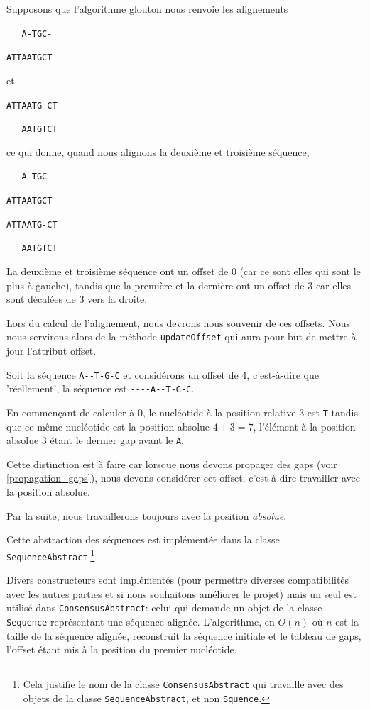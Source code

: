 \begin{exemple} [Offset]
	Supposons que l'algorithme glouton nous renvoie les alignements

	\verb|   A-TGC-|

	\verb|ATTAATGCT|

	et

	\verb|ATTAATG-CT|

	\verb|   AATGTCT|

	ce qui donne, quand nous alignons la deuxième et troisième séquence,

	\verb|   A-TGC-|

	\verb|ATTAATGCT|

	\verb|ATTAATG-CT|

	\verb|   AATGTCT|

	La deuxième et troisième séquence ont un offset de 0 (car ce sont elles qui
	sont le plus à gauche), tandis que la première et la dernière ont un offset
	de 3 car elles sont décalées de 3 vers la droite.

	Lors du calcul de l'alignement, nous devrons nous souvenir de ces offsets.
	Nous nous servirons alors de la méthode \verb|updateOffset| qui aura pour
	but de mettre à jour l'attribut offset.
\end{exemple}

\begin{exemple} 
	Soit la séquence \verb|A--T-G-C| et considérons un offset de 4, c'est-à-dire
	que 'réellement', la séquence est \verb|----A--T-G-C|.

	En commençant de calculer à 0, le nucléotide à la position relative 3 est
	\verb|T| tandis que ce même nucléotide est la position absolue $4 + 3 = 7$,
	l'élément à la position absolue 3 étant le dernier gap avant le \verb|A|.
\end{exemple}

Cette distinction est à faire car lorsque nous devons propager des gaps (voir
\ref{propagation_gaps}), nous devons considérer cet offset, c'est-à-dire
travailler avec la position absolue.

Par la suite, nous travaillerons toujours avec la position \textit{absolue}.

Cette abstraction des séquences est implémentée dans la classe
\verb|SequenceAbstract|.\footnote{Cela justifie le nom de la classe
	\verb|ConsensusAbstract| qui travaille avec des objets de la classe
\verb|SequenceAbstract|, et non \verb|Squence|.}

Divers constructeurs sont implémentés (pour permettre diverses compatibilités
avec les autres parties et si nous souhaitons améliorer le projet) mais un seul
est utilisé dans \verb|ConsensusAbstract|: celui qui demande un objet de la
classe \verb|Sequence| représentant une séquence alignée.  L'algorithme, en
$O(n)$ où $n$ est la taille de la séquence alignée, reconstruit la séquence
initiale et le tableau de gaps, l'offset étant mis à la position du premier
nucléotide.

